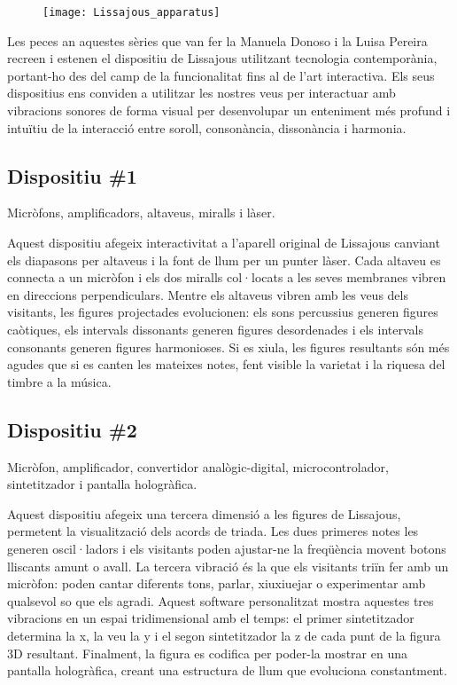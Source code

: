 \begin{figure}[!h]
\centering
\texttt{[image: Lissajous\_apparatus]}
\end{figure}

Les peces an aquestes sèries que van fer la Manuela Donoso i la Luisa Pereira recreen i estenen el dispositiu de Lissajous utilitzant tecnologia contemporània, portant-ho des del camp de la funcionalitat fins al de l'art interactiva. Els seus dispositius ens conviden a utilitzar les nostres veus per interactuar amb vibracions sonores de forma visual per desenvolupar un enteniment més profund i intuïtiu de la interacció entre soroll, consonància, dissonància i harmonia.

\subsection{Dispositiu \#1}
Micròfons, amplificadors, altaveus, miralls i làser.

Aquest dispositiu afegeix interactivitat a l'aparell original de Lissajous canviant els diapasons per altaveus i la font de llum per un punter làser. Cada altaveu es connecta a un micròfon i els dos miralls col·locats a les seves membranes vibren en direccions perpendiculars. Mentre els altaveus vibren amb les veus dels visitants, les figures projectades evolucionen: els sons percussius generen figures caòtiques, els intervals dissonants generen figures desordenades i els intervals consonants generen figures harmonioses. Si es xiula, les figures resultants són més agudes que si es canten les mateixes notes, fent visible la varietat i la riquesa del timbre a la música.


\subsection{Dispositiu \#2}
Micròfon, amplificador, convertidor analògic-digital, microcontrolador, sintetitzador i pantalla hologràfica.

Aquest dispositiu afegeix una tercera dimensió a les figures de Lissajous, permetent la visualització dels acords de triada. Les dues primeres notes les generen oscil·ladors i els visitants poden ajustar-ne la freqüència movent botons lliscants amunt o avall. La tercera vibració és la que els visitants triïn fer amb un micròfon: poden cantar diferents tons, parlar, xiuxiuejar o experimentar amb qualsevol so que els agradi. Aquest software personalitzat mostra aquestes tres vibracions en un espai tridimensional amb el temps: el primer sintetitzador determina la x, la veu la y i el segon sintetitzador la z de cada punt de la figura 3D resultant. Finalment, la figura es codifica per poder-la mostrar en una pantalla hologràfica, creant una estructura de llum que evoluciona constantment.

